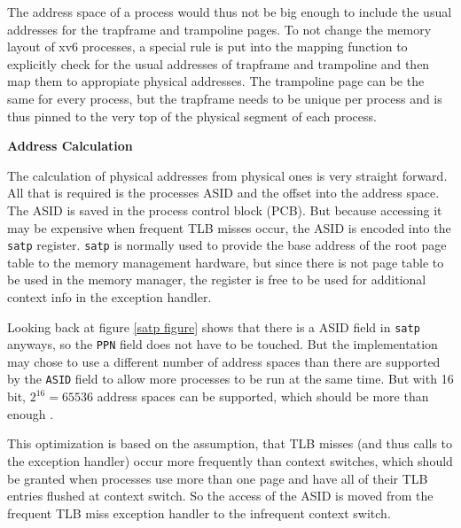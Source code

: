 The address space of a process would thus not be big enough to include the usual addresses for the
trapframe and trampoline pages.
To not change the memory layout of xv6 processes, a special rule is put into the mapping function
to explicitly check for the usual addresses of trapframe and trampoline and then map them to appropiate physical addresses.
The trampoline page can be the same for every process, but the trapframe needs to be unique per
process and is thus pinned to the very top of the physical segment of each process.





\textbf{Address Calculation}

The calculation of physical addresses from physical ones is very straight forward. All that is required is the processes ASID and the offset into the address space.
The ASID is saved in the process control block (PCB). But because accessing it may be expensive when frequent TLB misses occur, the ASID is encoded into the \texttt{satp} register.
\texttt{satp} is normally used to provide the base address of the root page table to the memory management hardware, but since there is not page table to be used in the memory manager, the register is free to be used for additional context info in the exception handler.

Looking back at figure \ref{satp figure} shows that there is a ASID field in \texttt{satp} anyways,
so the \texttt{PPN} field does not have to be touched.
But the implementation may chose to use a different number of address spaces than there are supported by the \texttt{ASID} field to allow more processes to be run at the same time.
But with 16 bit, $2^16 = 65536$ address spaces can be supported, which should be more than enough .

This optimization is based on the assumption, that TLB misses (and thus calls to the exception handler) occur more frequently than context switches, which should be granted when processes use more than one page and have all of their TLB entries flushed at context switch.
So the access of the ASID is moved from the frequent TLB miss exception handler to the infrequent context switch. %





